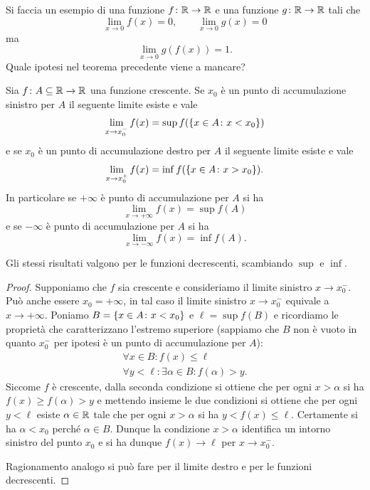 \begin{exercise}
  Si faccia un esempio di una funzione $f\colon{\mathbb R}\to {\mathbb R}$ 
  e una funzione $g\colon{\mathbb R}\to {\mathbb R}$ tali che 
  \[
  \lim_{x\to 0} f(x) = 0, \qquad 
  \lim_{x\to 0} g(x) = 0
  \]
  ma
  \[
  \lim_{x\to 0} g(f(x)) = 1.
  \]
  Quale ipotesi nel teorema precedente viene a mancare?
\end{exercise}

\begin{theorem}%
  \mymark{**}%
  \label{th:limite_funzione_monotona}%
Sia $f\colon A \subseteq {\mathbb R} \to {\mathbb R}$ una funzione crescente. 
Se $x_0$ è un punto di accumulazione sinistro per $A$ 
il seguente limite esiste e vale
\[
   \lim_{x\to x_0^-}f(x) = \sup f({\left\{ x\in A\colon x<x_0 \right\}})
\]
e se $x_0$ è un punto di accumulazione destro per $A$ 
il seguente limite esiste e vale
\[
   \lim_{x\to x_0^+} f(x) = \inf f({\left\{ x\in A\colon x>x_0 \right\}}).
\]
In particolare se $+\infty$ è punto di accumulazione per $A$ 
si ha 
\[
  \lim_{x\to +\infty} f(x) = \sup f(A)
\]
e se $-\infty$ è punto di accumulazione per $A$ si ha 
\[
  \lim_{x\to -\infty} f(x) = \inf f(A).
\]

Gli stessi risultati valgono per le funzioni decrescenti, 
scambiando $\sup$ e $\inf$.
\end{theorem}
%
\begin{proof}\mymark{**}
Supponiamo che $f$ sia crescente e consideriamo il limite 
sinistro $x\to x_0^-$. Può anche essere $x_0=+\infty$, in tal 
caso il limite sinistro $x\to x_0^-$ equivale a $x\to +\infty$.
Poniamo $B={\left\{ x\in A\colon x<x_0 \right\}}$
e $\ell=\sup f(B)$ e ricordiamo le proprietà che caratterizzano 
l'estremo superiore
(sappiamo che $B$ non è vuoto in quanto $x_0^-$ per ipotesi 
è un punto di accumulazione per $A$):
\begin{gather*}
  \forall x \in B \colon f(x) \le \ell \\
  \forall y < \ell \colon \exists \alpha \in B \colon f(\alpha) > y.
\end{gather*}
Siccome $f$ è crescente, dalla seconda condizione 
si ottiene che per ogni $x>\alpha$ si ha $f(x)\ge f(\alpha)> y$
e mettendo insieme le due condizioni si ottiene che per ogni $y<\ell$
esiste $\alpha\in{\mathbb R}$ tale che per ogni $x>\alpha$ si ha $y<f(x)\le \ell$.
Certamente si ha $\alpha < x_0$ perché $\alpha\in B$.   
Dunque la condizione $x>\alpha$ identifica un intorno sinistro 
del punto $x_0$ e si ha dunque $f(x)\to \ell$ per $x\to x_0^-$.

Ragionamento analogo si può fare per il limite destro  
e per le funzioni decrescenti.
\end{proof}

